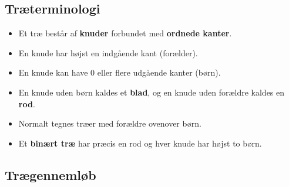 \documentclass[rgb]{beamer}
\begin{document}
\subsection{Træterminologi}
\begin{frame}[fragile]
\begin{footnotesize}

  \vspace{1ex}

  \begin{minipage}{0.6\textwidth}
    \begin{itemize}
    \item Et træ består af \textbf{knuder} forbundet med \textbf{ordnede kanter}.
    \item En knude har højst en indgående kant (forælder).
    \item En knude kan have 0 eller flere udgående kanter (børn).
    \item En knude uden børn kaldes et \textbf{blad}, og en knude uden forældre kaldes en \textbf{rod}.
    \item Normalt tegnes træer med forældre ovenover børn.
    \item Et \textbf{binært træ} har præcis en rod og hver knude har højst to børn.
      \end{itemize}
  \end{minipage}
  \begin{minipage}{0.35\textwidth}
    \end{minipage}

\end{footnotesize}
\end{frame}

\subsection{Trægennemløb}
\end{document}
